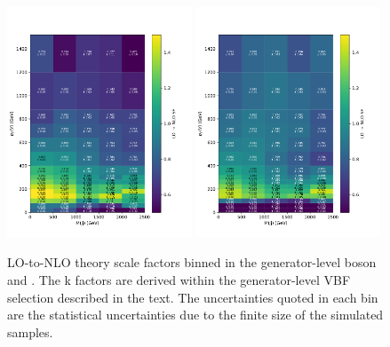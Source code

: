 \begin{figure}[ht!]
    \begin{center}
        \includegraphics[width=0.49\textwidth]{fig/theory/2d_dy_gen_vpt_vbf_dress.pdf}
        \includegraphics[width=0.49\textwidth]{fig/theory/2d_wjet_gen_vpt_vbf_dress.pdf} \\
        \caption{
            LO-to-NLO theory scale factors binned in the generator-level boson \pt and \mjj.
            The k factors are derived within the generator-level VBF selection described in the text.
            The uncertainties quoted in each bin are the statistical uncertainties due to the finite size of the simulated samples.
          }
      \label{fig:theory_sf_qcd_nlo_2d_wz}
    \end{center}
  \end{figure}

